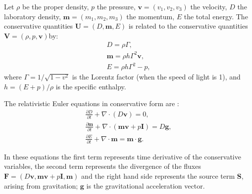 Let $\rho$ be the proper density, $p$ the pressure, $\textbf{v} =( v_1, v_2, v_3)$ the velocity, $D$ the laboratory density, $\textbf{m} = (m_1, m_2, m_3)$ the momentum, $E$ the total energy. The conservative quantities  $\textbf{U} = (D, \textbf{m}, E)$ is related to the conservative quantities $\textbf{V} = (\rho, p, \textbf{v})$by:
\begin{eqnarray}
D = \rho \Gamma, \nonumber \\  
\textbf{m} = \rho h \Gamma^2 \textbf{v}, \\
E = \rho h \Gamma^2 -p \nonumber,
\end{eqnarray}
where $\Gamma = 1/\sqrt{1 - v^2}$ is the Lorentz factor (when the speed of light is 1), and $h = (E+p)/\rho$ is the specific enthalpy.

The relativistic Euler equations in conservative form are  \citep{pluto12}:
\begin{eqnarray}
\frac{\partial D}{\partial t} +  \nabla \cdot (D\textbf{v})= 0  \label{eq:d},\\
\frac{\partial \textbf{m}}{\partial t} + \nabla \cdot (\textbf{m}\textbf{v} + p\textbf{I}) = D\textbf{g},  \label{eq:m}\\
\frac{\partial E}{\partial t} + \nabla \cdot \textbf{m}  = \textbf{m} \cdot \textbf{g}. \label{eq:e}
\end{eqnarray}

In these equations the first term represents time derivative of the conservative variables, the second term represents the divergence of the fluxes $\textbf{F} =(D \textbf{v}, \textbf{mv}+ p\textbf{I}, \textbf{m})$ and the right hand side represents the source term \textbf{S}, arising from gravitation; $\textbf{g}$ is the  gravitational acceleration vector. 


